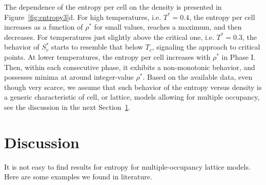 \documentclass[entropy,article,submit,pdftex,moreauthors]{Definitions/mdpi}
\begin{document}
The dependence of the entropy per cell on the density is presented in Figure~\ref{fig:entropy3}d. For high temperatures, i.e. $T^*=0.4$, the entropy per cell increases as a function of $\rho^*$ for small values, reaches a maximum, and then decreases. For temperatures just slightly above the critical one, i.e. $T^*=0.3$, the behavior of $S^*_v$ starts to resemble that below $T_c$, signaling the approach to critical points. At lower temperatures, the entropy per cell increases with $\rho^*$ in Phase I. Then, within each consecutive phase, it exhibits a non-monotonic behavior, and possesses minima at around integer-value $\rho^*$.
Based on the available data, even though very scarce, we assume that such behavior of the entropy versus density is a generic characteristic of cell, or lattice, models allowing for multiple occupancy, see the discussion in the next Section~\ref{sec:dis}.

\section{Discussion}\label{sec:dis}
It is not easy to find results for entropy for multiple-occupancy lattice models. Here are some examples we found in literature.
\end{document}
